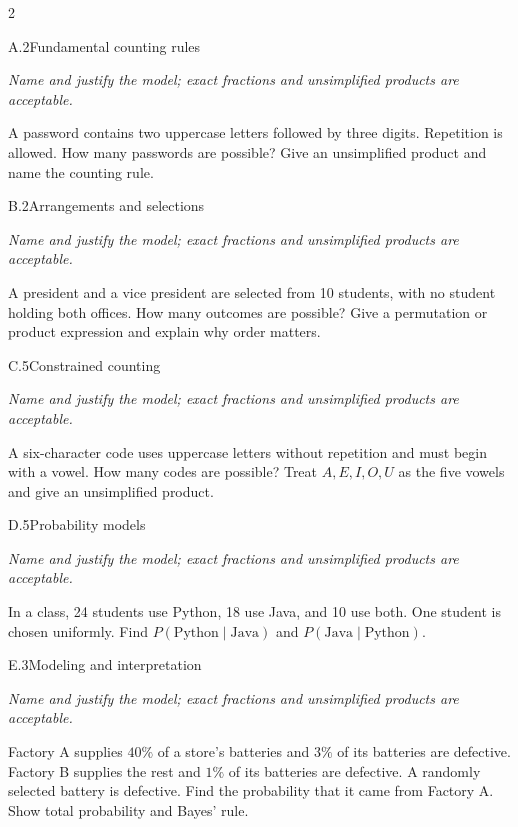 \documentclass[9pt]{extarticle}
\begin{document}
\CoreWorkArea
\FormBreak
{}
\begin{multicols}{2}
\begin{CoreProblem}{A.2}{Fundamental counting rules}
{\scriptsize\textit{Name and justify the model; exact fractions and unsimplified products are acceptable.}\par}
A password contains two uppercase letters followed by three digits.
    Repetition is allowed. How many passwords are possible? Give an unsimplified
    product and name the counting rule.
\end{CoreProblem}
\begin{CoreProblem}{B.2}{Arrangements and selections}
{\scriptsize\textit{Name and justify the model; exact fractions and unsimplified products are acceptable.}\par}
A president and a vice president are selected from 10 students, with
    no student holding both offices. How many outcomes are possible? Give a
    permutation or product expression and explain why order matters.
\end{CoreProblem}
\begin{CoreProblem}{C.5}{Constrained counting}
{\scriptsize\textit{Name and justify the model; exact fractions and unsimplified products are acceptable.}\par}
A six-character code uses uppercase letters without repetition and
    must begin with a vowel. How many codes are possible? Treat
    $A,E,I,O,U$ as the five vowels and give an unsimplified product.
\end{CoreProblem}
\columnbreak
\begin{CoreProblem}{D.5}{Probability models}
{\scriptsize\textit{Name and justify the model; exact fractions and unsimplified products are acceptable.}\par}
In a class, 24 students use Python, 18 use Java, and 10 use both.
    One student is chosen uniformly. Find
    $P(\text{Python}\mid\text{Java})$ and
    $P(\text{Java}\mid\text{Python})$.
\end{CoreProblem}
\begin{CoreProblem}{E.3}{Modeling and interpretation}
{\scriptsize\textit{Name and justify the model; exact fractions and unsimplified products are acceptable.}\par}
Factory A supplies $40\%$ of a store's batteries and $3\%$ of its
    batteries are defective. Factory B supplies the rest and $1\%$ of its
    batteries are defective. A randomly selected battery is defective. Find the
    probability that it came from Factory A. Show total probability and Bayes'
    rule.
\end{CoreProblem}
\end{multicols}
\end{document}
